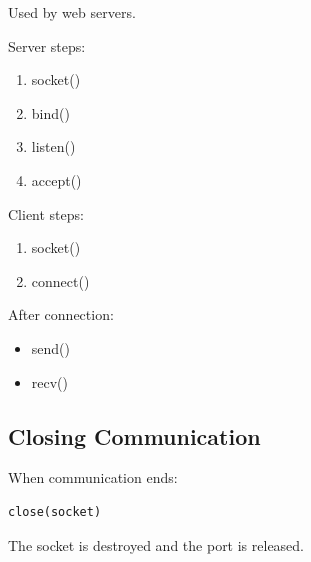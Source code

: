 Used by web servers.

Server steps:

\begin{enumerate}
\item socket()
\item bind()
\item listen()
\item accept()
\end{enumerate}

Client steps:

\begin{enumerate}
\item socket()
\item connect()
\end{enumerate}

After connection:

\begin{itemize}
\item send()
\item recv()
\end{itemize}

\subsection{Closing Communication}

When communication ends:

\begin{verbatim}
close(socket)
\end{verbatim}

The socket is destroyed and the port is released.


